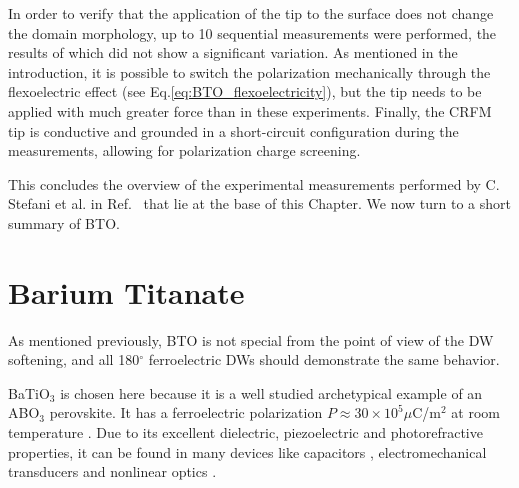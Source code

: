In order to verify that the application of the tip to the surface does not change the domain morphology, up to 10 sequential measurements were performed, the results of which did not show a significant variation.
As mentioned in the introduction, it is possible to switch the polarization mechanically through the flexoelectric effect (see Eq.\ref{eq:BTO_flexoelectricity}), but the tip needs to be applied with much greater force than in these experiments.
Finally, the CRFM tip is conductive and grounded in a short-circuit configuration during the measurements, allowing for polarization charge screening.

This concludes the overview of the experimental measurements performed by C. Stefani et al. in Ref.~\cite{Stefani2020} that lie at the base of this Chapter.
We now turn to a short summary of BTO.

\section{Barium Titanate}
As mentioned previously, BTO is not special from the point of view of the DW softening, and all 180$^\circ$ ferroelectric DWs should demonstrate the same behavior.

BaTiO$_3$ is chosen here because it is a well studied archetypical example of an ABO$_3$ perovskite.
It has a ferroelectric polarization $P \approx 30 \times 10^5 \mu $C/m$^2$ at room temperature \cite{Mason1948, VonHippel1950, Ghosez1994}.
Due to its excellent dielectric, piezoelectric and photorefractive properties, it can be found in many devices like capacitors \cite{American1963}, electromechanical transducers \cite{Schofield1957} and nonlinear optics \cite{Ramakanth2015}.

